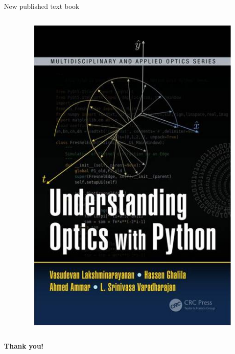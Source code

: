 \documentclass[9pt]{beamer}
\begin{document}
\begin{frame}{New published text book}
\begin{columns}[c]
\begin{column}{0.6\textwidth}
		
	\end{column}
	\begin{column}{0.4\textwidth}
		\begin{figure}
			\includegraphics[width=\linewidth]{images/Image5}
			
		\end{figure}
	\end{column}
\end{columns}

\end{frame}


\begin{frame}
\centering
\huge \textbf{Thank you!}
\end{frame}
\end{document}
